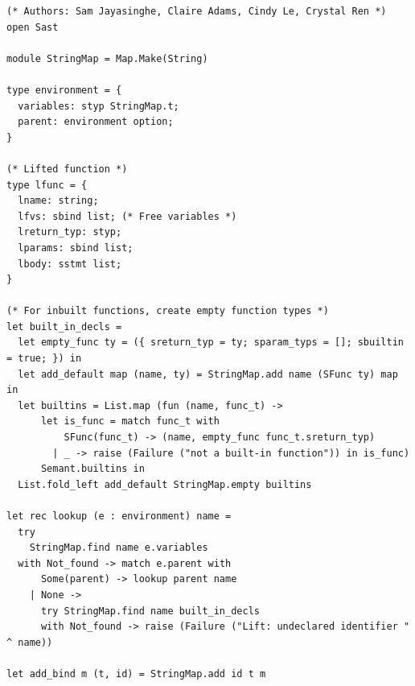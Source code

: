 \documentclass[12pt]{article}
\begin{document}
\begin{mdframed}[hidealllines=true,backgroundcolor=blue!20]
\begin{lstlisting}
(* Authors: Sam Jayasinghe, Claire Adams, Cindy Le, Crystal Ren *)
open Sast

module StringMap = Map.Make(String)

type environment = {
  variables: styp StringMap.t;
  parent: environment option;
}

(* Lifted function *)
type lfunc = {
  lname: string;
  lfvs: sbind list; (* Free variables *)
  lreturn_typ: styp;
  lparams: sbind list;
  lbody: sstmt list;
}

(* For inbuilt functions, create empty function types *)
let built_in_decls =
  let empty_func ty = ({ sreturn_typ = ty; sparam_typs = []; sbuiltin = true; }) in
  let add_default map (name, ty) = StringMap.add name (SFunc ty) map in
  let builtins = List.map (fun (name, func_t) -> 
      let is_func = match func_t with 
          SFunc(func_t) -> (name, empty_func func_t.sreturn_typ) 
        | _ -> raise (Failure ("not a built-in function")) in is_func)
      Semant.builtins in
  List.fold_left add_default StringMap.empty builtins

let rec lookup (e : environment) name =
  try
    StringMap.find name e.variables
  with Not_found -> match e.parent with
      Some(parent) -> lookup parent name
    | None ->
      try StringMap.find name built_in_decls
      with Not_found -> raise (Failure ("Lift: undeclared identifier " ^ name))

let add_bind m (t, id) = StringMap.add id t m


\end{lstlisting}
\end{mdframed}
\end{document}

